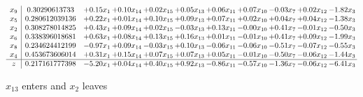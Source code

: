\documentclass[9pt]{article}
\begin{document}
 \[\begin{array}{c| c c@{\hskip 2pt} c@{\hskip 2pt} c@{\hskip 2pt} c@{\hskip 2pt} c@{\hskip 2pt} c@{\hskip 2pt} c@{\hskip 2pt} c@{\hskip 2pt} c@{\hskip 2pt} }
 x_{9}   &  0.30290613733 & +  0.15 x_{1} & +  0.10 x_{14} & +  0.02 x_{15} & +  0.05 x_{13} & +  0.06 x_{11} & +  0.07 x_{10} & -0.03 x_{7} & +  0.02 x_{12} & -1.82 x_{3}\\
 x_{5}   &  0.280612039136 & +  0.22 x_{1} & +  0.01 x_{14} & +  0.10 x_{15} & +  0.09 x_{13} & +  0.07 x_{11} & +  0.02 x_{10} & +  0.04 x_{7} & +  0.04 x_{12} & -1.38 x_{3}\\
 x_{2}   &  0.308278014825 & +  0.43 x_{1} & +  0.09 x_{14} & +  0.02 x_{15} & -0.03 x_{13} & +  0.13 x_{11} & -0.00 x_{10} & +  0.41 x_{7} & -0.01 x_{12} & -0.50 x_{3}\\
 x_{6}   &  0.338396018681 & +  0.63 x_{1} & +  0.08 x_{14} & +  0.13 x_{15} & +  0.16 x_{13} & +  0.01 x_{11} & -0.01 x_{10} & +  0.41 x_{7} & +  0.09 x_{12} & -1.99 x_{3}\\
 x_{8}   &  0.234624412199 & -0.97 x_{1} & +  0.09 x_{14} & -0.03 x_{15} & +  0.10 x_{13} & -0.06 x_{11} & -0.06 x_{10} & -0.51 x_{7} & -0.07 x_{12} & -0.55 x_{3}\\
 x_{4}   &  0.453673606014 & +  0.31 x_{1} & +  0.15 x_{14} & +  0.07 x_{15} & +  0.07 x_{13} & +  0.05 x_{11} & -0.01 x_{10} & -0.50 x_{7} & -0.06 x_{12} & -1.44 x_{3}\\
\hline
z    &  0.217161777398 & -5.20 x_{1} & +  0.04 x_{14} & +  0.40 x_{15} & +  0.92 x_{13} & -0.86 x_{11} & -0.57 x_{10} & -1.36 x_{7} & -0.06 x_{12} & -6.41 x_{3}\\
\end{array}\]


 $ x_{13} $ enters and $ x_{2} $ leaves 
\end{document}
